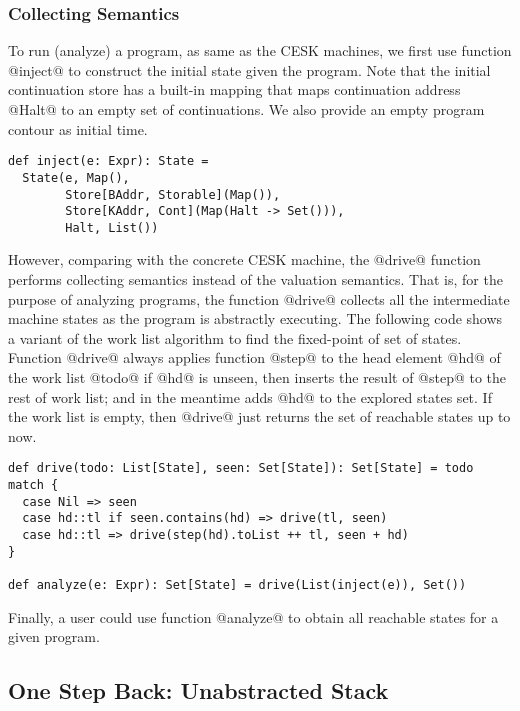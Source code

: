 \documentclass[acmsmall,review,anonymous]{acmart}\settopmatter{printfolios=true,printccs=false,printacmref=false}
\begin{document}
\subsubsection{Collecting Semantics}

To run (analyze) a program, as same as the CESK machines, 
we first use function @inject@ to construct the initial state given the program. 
Note that the initial continuation store has a built-in mapping that maps continuation address
@Halt@ to an empty set of continuations.
We also provide an empty program contour as initial time.
\begin{lstlisting}
def inject(e: Expr): State = 
  State(e, Map(), 
        Store[BAddr, Storable](Map()), 
        Store[KAddr, Cont](Map(Halt -> Set())), 
        Halt, List())
\end{lstlisting}

However, comparing with the concrete CESK machine, the
@drive@ function performs collecting semantics instead of the valuation
semantics. That is, for the purpose of analyzing programs, the function @drive@
collects all the intermediate machine states as the program is abstractly executing.
The following code shows a variant of the work list algorithm to find the fixed-point 
of set of states.
Function @drive@ always applies function @step@ to the head element @hd@ of 
the work list @todo@ if @hd@ is unseen, then inserts the result of @step@ to 
the rest of work list; and in the meantime adds @hd@ to the explored states set.
If the work list is empty, then @drive@ just returns the set of reachable states 
up to now.

\begin{lstlisting}
def drive(todo: List[State], seen: Set[State]): Set[State] = todo match {
  case Nil => seen
  case hd::tl if seen.contains(hd) => drive(tl, seen)
  case hd::tl => drive(step(hd).toList ++ tl, seen + hd)
}

def analyze(e: Expr): Set[State] = drive(List(inject(e)), Set())
\end{lstlisting}

Finally, a user could use function @analyze@ to obtain all reachable states for a given program.


\subsection{One Step Back: Unabstracted Stack}
\end{document}
